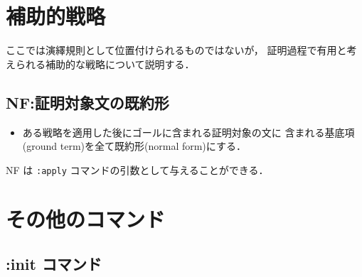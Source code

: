 \documentclass[a4paper,oneside,10pt,here]{memoir}
\def\SP{\mathit{SP}}
\begin{document}
\section{補助的戦略}\label{sec:suppliment}
ここでは演繹規則として位置付けられるものではないが，
証明過程で有用と考えられる補助的な戦略について説明する．

\subsection{NF:証明対象文の既約形}\label{sec:normal-form}

\begin{itemize}
\item ある戦略を適用した後にゴールに含まれる証明対象の文に
  含まれる基底項(ground term)を全て既約形(normal form)にする．
\end{itemize}
NF は \verb|:apply| コマンドの引数として与えることができる．




\section{その他のコマンド}\label{sec:other-commands}

\subsection{:init コマンド} 
\end{document}
